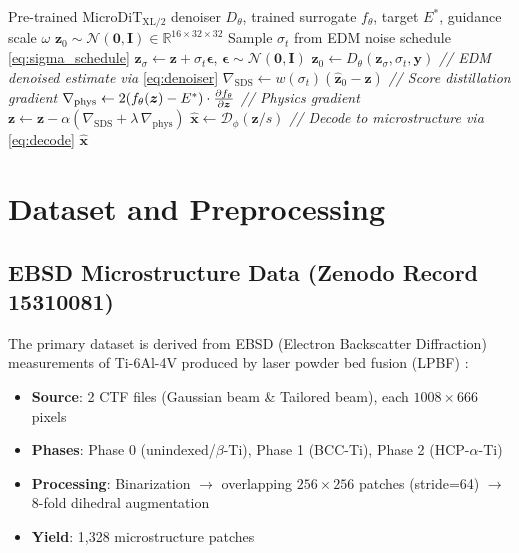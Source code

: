 \documentclass[12pt,a4paper]{article}
\newcommand{\R}{\mathbb{R}}
\newcommand{\N}{\mathcal{N}}
\newcommand{\Etar}{E^{*}}
\newcommand{\zvec}{\bm{z}}
\newcommand{\xvec}{\bm{x}}
\theoremstyle{definition}
\begin{document}
\begin{algorithm}[H]
\caption{SDS Inverse Design Loop (Part 2)}
\label{alg:sds}
\begin{algorithmic}[1]
\REQUIRE Pre-trained MicroDiT$_{\text{XL/2}}$ denoiser $D_\theta$, trained
  surrogate $f_\theta$, target $\Etar$, guidance scale $\omega$
\STATE $\zvec_0 \sim \N(\bm{0}, \bm{I}) \in \R^{16 \times 32 \times 32}$
  \STATE Sample $\sigma_t$ from EDM noise schedule \eqref{eq:sigma_schedule}
  \STATE $\zvec_\sigma \gets \zvec + \sigma_t \bm{\epsilon}$, \quad $\bm{\epsilon} \sim \N(\bm{0}, \bm{I})$
  \STATE $\hat{\zvec}_0 \gets D_\theta(\zvec_\sigma, \sigma_t, \bm{y})$
    \hfill \textit{// EDM denoised estimate via} \eqref{eq:denoiser}
  \STATE $\nabla_{\mathrm{SDS}} \gets w(\sigma_t)(\hat{\zvec}_0 - \zvec)$
    \hfill \textit{// Score distillation gradient}
  \STATE $\nabla_{\mathrm{phys}} \gets 2(f_\theta(\zvec) - \Etar) \cdot \pdv{f_\theta}{\zvec}$
    \hfill \textit{// Physics gradient}
  \STATE $\zvec \gets \zvec - \alpha(\nabla_{\mathrm{SDS}} + \lambda\,\nabla_{\mathrm{phys}})$
\ENDFOR
\STATE $\hat{\xvec} \gets \mathcal{D}_\phi(\zvec / s)$
  \hfill \textit{// Decode to microstructure via} \eqref{eq:decode}
\RETURN $\hat{\xvec}$
\end{algorithmic}
\end{algorithm}

\section{Dataset and Preprocessing}
\label{sec:data}

\subsection{EBSD Microstructure Data (Zenodo Record 15310081)}

The primary dataset is derived from EBSD (Electron Backscatter Diffraction)
measurements of Ti-6Al-4V produced by laser powder bed fusion (LPBF)
\cite{esmaeilzadeh2025}:
\begin{itemize}[nosep]
  \item \textbf{Source}: 2 CTF files (Gaussian beam \& Tailored beam), each $1008 \times 666$ pixels
  \item \textbf{Phases}: Phase 0 (unindexed/$\beta$-Ti), Phase 1 (BCC-Ti), Phase 2 (HCP-$\alpha$-Ti)
  \item \textbf{Processing}: Binarization $\to$ overlapping $256\times256$ patches (stride=64) $\to$ 8-fold dihedral augmentation
  \item \textbf{Yield}: 1{,}328 microstructure patches
\end{itemize}
\end{document}
